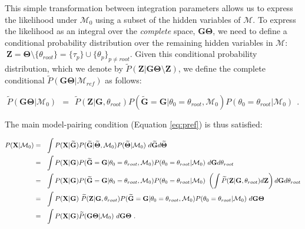 \documentclass[11pt]{article}
\newcommand{\vect}[1]{\boldsymbol{\mathbf{#1}}}
\newcommand{\X}{\vect{X}}
\newcommand{\M}{\mathcal{M}}
\newcommand{\G}{\vect{G}}
\newcommand{\T}{\vect{\Theta}}
\newcommand{\GT}{\G\T}
\newcommand{\Mref}{\M_{ref}}
\newcommand{\Pref}{\widetilde{P}}
\newcommand{\Gref}{\widetilde{\G}}
\newcommand{\Tref}{\widetilde{\T}}
\newcommand{\Z}{\vect{Z}}
\newcommand{\troot}{\theta_{root}}
\begin{document}
This simple transformation between integration parameters allows us to express the likelihood under $\M_0$
using a subset of the hidden variables of $\M$.
%
To express the likelihood as an integral over the {\em complete} space, $\GT$, we need to define a
conditional probability distribution over the remaining hidden variables in $\M$:
$~ \Z=\T\setminus \{\troot\} = \{\tau_p\}\cup\{\theta_p\}_{p\neq root}$.
%
Given this conditional probability distribution, which we denote by $\Pref(\Z|\GT\setminus\Z)$, we define the
complete conditional $\Pref(\GT|\Mref)$ as follows:
%
%
\begin{small}
\begin{equation}
 \Pref(\GT|\M_0)  ~~=~~
 \Pref(\Z|\G,\troot) P(\Gref=\G|\theta_0=\troot,\M_0) P(\theta_0=\troot|\M_0)\ ~ .\label{eq:pref_null}
\end{equation}
\end{small}
%
%
The main model-pairing condition (Equation \ref{eq:pref}) is thus satisfied:
%
%
\begin{small}
\begin{align}
P(\X|\M_0)
&=~~ \int P(\X|\Gref) P(\Gref|\Tref,\M_0) P(\Tref|\M_0)\ d\Gref d\Tref  \notag \\ %
&=~~ \int P(\X|\G) P(\Gref=\G|\theta_0=\troot,\M_0) P(\theta_0=\troot|\M_0)\ d\G d\troot \notag \\ 
&=~~ \int P(\X|\G) P(\Gref=\G|\theta_0=\troot,\M_0) P(\theta_0=\troot|\M_0)\ 
\left( \int \Pref(\Z|\G,\troot)d\Z\right)d\G d\troot \notag \\ 
%
&=~~ \int P(\X|\G)\ \Pref(\Z|\G,\troot) P(\Gref=\G|\theta_0=\troot,\M_0) P(\theta_0=\troot|\M_0)\ d\GT \notag \\ 
&=~~ \int P(\X|\G) \Pref(\GT|\M_0)\ d\GT ~. \label{eq:likelihood_null} %
\end{align}
\end{small}

\end{document}
